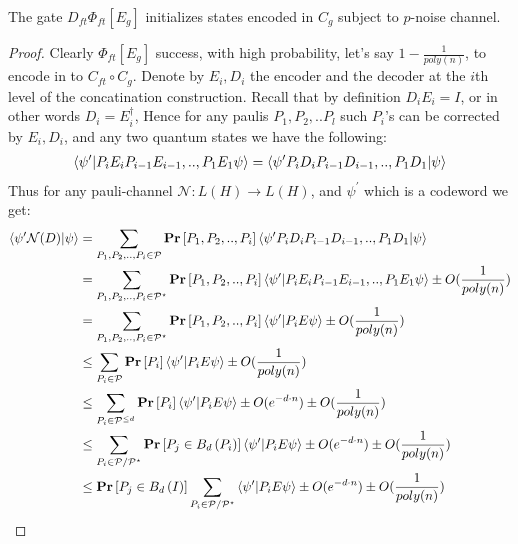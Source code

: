 \documentclass[manuscript,screen,review]{acmart}
\begin{document}
\begin{claim}
  The gate $ D_{ft} \Phi_{ft}[E_{g}]$ initializes states encoded in $C_{g}$ subject to $p$-noise channel.  
\end{claim}
\begin{proof}
  Clearly $\Phi_{ft}[E_{g}]$ success, with high probability, let's say $1 - \frac{1}{poly(n)}$, to encode in to $ C_{ft} \circ C_{g}$. Denote by $E_{i}, D_{i}$ the encoder and the decoder at the $i$th level of the concatination construction. Recall that by definition $D_{i}E_{i} = I$, or in other words $D_{i}= E_{i}^{\dagger}$, Hence for any paulis  $P_{1},P_{2},..P_{l}$ such $P_{i}$'s can be corrected by $E_{i},D_{i}$, and any two quantum states we have the following:  
  \begin{equation*}
    \begin{split}
      \braket{ \psi^{\prime} | P_{i}E_{i}P_{i-1}E_{i-1},..,P_{1}E_{1} \psi } = \braket{ \psi^{\prime} P_{i}D_{i}P_{i-1}D_{i-1},..,P_{1}D_{1} | \psi }
    \end{split}
  \end{equation*}
  Thus for any pauli-channel $\mathcal{N} : L(H) \rightarrow L(H)$, and $\psi^{\prime}$ which is a codeword we get: 
  \begin{equation*}
    \begin{split}
      \braket{ \psi^{\prime} \mathcal{N}(D) | \psi } &=  \sum_{P_{1}, P_{2}, .., P_{i} \in \mathcal{P}}{ \mathbf{Pr} \left[ P_{1}, P_{2}, .., P_{i} \right]  \braket{ \psi^{\prime} P_{i}D_{i}P_{i-1}D_{i-1},..,P_{1}D_{1} | \psi }} \\
      &=  \sum_{P_{1}, P_{2}, .., P_{i} \in \mathcal{P}^{\star}}{  \mathbf{Pr} \left[ P_{1}, P_{2}, .., P_{i} \right]\braket{ \psi^{\prime} | P_{i}E_{i}P_{i-1}E_{i-1},..,P_{1}E_{1} \psi }} \pm O(  \frac{1}{poly(n)})\\
      &=  \sum_{P_{1}, P_{2}, .., P_{i} \in \mathcal{P}^{\star}}{  \mathbf{Pr} \left[ P_{1}, P_{2}, .., P_{i} \right]\braket{ \psi^{\prime} | P_{i} E \psi }} \pm O(  \frac{1}{poly(n)})\\
      &\le  \sum_{ P_{i} \in \mathcal{P}}{  \mathbf{Pr} \left[  P_{i} \right]\braket{ \psi^{\prime} | P_{i} E \psi }} \pm O(  \frac{1}{poly(n)}) \\
      &\le  \sum_{ P_{i} \in \mathcal{P}^{\le d}}{  \mathbf{Pr} \left[  P_{i} \right]\braket{ \psi^{\prime} | P_{i} E \psi }} \pm O (e^{-d \cdot n} ) \pm O(  \frac{1}{poly(n)}) \\
      & \le   \sum_{ P_{i} \in \mathcal{P}/\mathcal{P}^{\star}}{  \mathbf{Pr} \left[  P_{j} \in B_{d}\left( P_{i} \right) \right]\braket{ \psi^{\prime} | P_{i} E \psi }}  \pm O (e^{-d \cdot n} ) \pm O(  \frac{1}{poly(n)}) \\
      & \le   \mathbf{Pr} \left[  P_{j} \in B_{d}\left( I \right) \right] \sum_{ P_{i} \in \mathcal{P}/\mathcal{P}^{\star}}{  \braket{ \psi^{\prime} | P_{i} E \psi }}  \pm O (e^{-d \cdot n} ) \pm O(  \frac{1}{poly(n)}) 
    \end{split}
  \end{equation*}
    
\end{proof}
\end{document}
